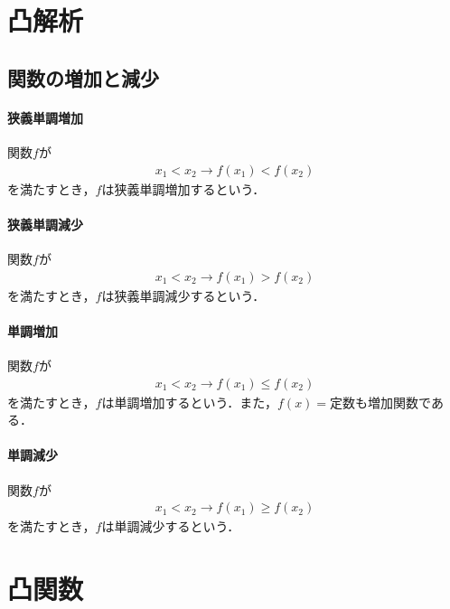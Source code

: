 \section{凸解析}
%

%
\subsection{関数の増加と減少}
\paragraph{狭義単調増加}
関数$f$が
　\begin{align}
　x_1<x_2\to f(x_1)<f(x_2)
\end{align}
を満たすとき，$f$は狭義単調増加するという．
\paragraph{狭義単調減少}
関数$f$が
　\begin{align}
　x_1<x_2\to f(x_1)>f(x_2)
\end{align}
を満たすとき，$f$は狭義単調減少するという．
\paragraph{単調増加}
関数$f$が
　\begin{align}
　x_1<x_2\to f(x_1)\leq f(x_2)
\end{align}
を満たすとき，$f$は単調増加するという．また，$f(x)=$定数も増加関数である．



\paragraph{単調減少}
関数$f$が
　\begin{align}
　x_1<x_2\to f(x_1)\geq f(x_2)
\end{align}
を満たすとき，$f$は単調減少するという．





\section{凸関数}
